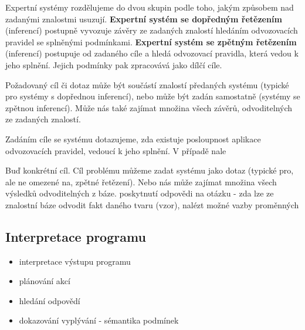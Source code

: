 Expertní systémy rozdělujeme do dvou skupin podle toho, jakým způsobem nad
zadanými znalostmi usuzují. \textbf{Expertní systém se dopředným řetězením}
(inferencí) postupně vyvozuje závěry ze zadaných znalostí hledáním odvozovacích
pravidel se splněnými podmínkami. \textbf{Expertní systém se zpětným řetězením}
(inferencí) postupuje od zadaného cíle a hledá odvozovací pravidla, která vedou
k jeho splnění. Jejich podmínky pak zpracovává jako dílčí cíle.

Požadovaný cíl či dotaz může být součástí znalostí předaných systému (typické
pro systémy s dopřednou inferencí), nebo může být zadán samostatně (systémy se
zpětnou inferencí). Může nás také zajímat množina všech závěrů, odvoditelných ze
zadaných znalostí.

Zadáním cíle se systému dotazujeme, zda existuje posloupnost aplikace
odvozovacích pravidel, vedoucí k jeho splnění. V případě nale

Buď konkrétní cíl.
Cíl problému můžeme zadat systému jako dotaz (typické pro, ale ne omezené na,
zpětné řetězení).
Nebo nás může zajímat množina všech výsledků odvoditelných z báze.
poskytnutí odpovědi na otázku - zda lze ze znalostní báze odvodit fakt daného
tvaru (vzor), nalézt možné vazby proměnných

\subsection{Interpretace programu}
\begin{framed}
  \begin{itemize}
    \item interpretace výstupu programu
    \item plánování akcí
    \item hledání odpovědí
    \item dokazování vyplývání - sémantika podmínek
  \end{itemize}
\end{framed}

